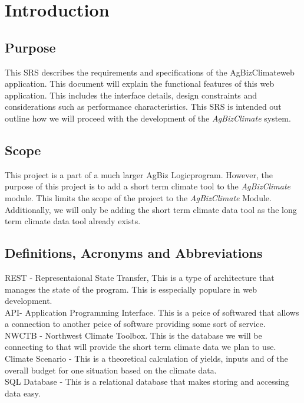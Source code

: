 \documentclass[onecolumn, draftclsnofoot,10pt, compsoc]{article}
\begin{document}
\section{Introduction}
		\subsection{Purpose}
		This SRS describes the requirements and specifications of the AgBizClimate\texttrademark web application. This document will explain the functional features of this web application. This includes the interface details, design constraints and considerations such as performance characteristics. This SRS is intended out outline how we will proceed with the development of the \textit{AgBizClimate} system.\\

		\subsection{Scope}
			This project is a part of a much larger AgBiz Logic\texttrademark program. However, the purpose of this project is to add a short term climate tool to the \textit{AgBizClimate} module. This limits the scope of the project to the \textit{AgBizClimate} Module. Additionally, we will only be adding the short term climate data tool as the long term climate data tool already exists.\\

		\subsection{Definitions, Acronyms and Abbreviations}
			REST - Representaional State Transfer, This is a type of architecture that manages the state of the program. This is esspecially populare in web development.\\
			API- Application Programming Interface. This is a peice of softwared that allows a connection to another peice of software providing some sort of service.\\
			NWCTB - Northwest Climate Toolbox. This is the database we will be connecting to that will provide the short term climate data we plan to use.\\
			Climate Scenario - This is a theoretical calculation of yields, inputs and of the overall budget for one situation based on the climate data.\\
			SQL Database - This is a relational database that makes storing and accessing data easy.\\
\end{document}
